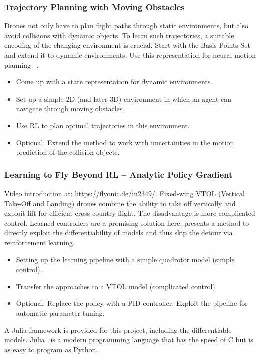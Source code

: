 \documentclass[a4paper]{article}
\begin{document}
\subsubsection{Trajectory Planning with Moving Obstacles}
Drones not only have to plan flight paths through static environments, but also avoid collisions with dynamic objects.
To learn such trajectories, a suitable encoding of the changing environment is crucial.
Start with the Basis Points Set ~\citet{Prokudin2019} and extend it to dynamic environments.
Use this representation for neural motion planning ~\citet{Qureshi2019}.
\begin{itemize}
  \item Come up with a state representation for dynamic environments.
  \item Set up a simple 2D (and later 3D) environment in which an agent can navigate through moving obstacles.
  \item Use RL to plan optimal trajectories in this environment.
  \item Optional: Extend the method to work with uncertainties in the motion prediction of the collision objects.
\end{itemize}


\subsubsection{Learning to Fly Beyond RL – Analytic Policy Gradient}
Video introduction at: \href{https://flyonic.de/in2349/}{https://flyonic.de/in2349/}.\newline
Fixed-wing VTOL (Vertical Take-Off and Landing) drones combine the ability to take off vertically and exploit lift for efficient cross-country flight. The disadvantage is more complicated control. Learned controllers are a promising solution here. \citet{wiedemann2023training} presents a method to directly exploit the differentiability of models and thus skip the detour via reinforcement learning.
\begin{itemize}
  \item Setting up the learning pipeline with a simple quadrotor model (simple control).
  \item Transfer the approaches to a VTOL model (complicated control)
  \item Optional: Replace the policy with a PID controller. Exploit the pipeline for automatic parameter tuning.
\end{itemize}
A Julia framework is provided for this project, including the differentiable models. Julia~\cite{WebJulia} is a modern programming language that has the speed of C but is as easy to program as Python.
\end{document}
